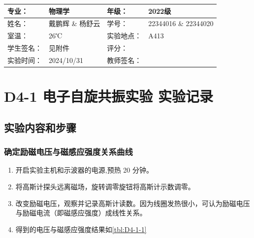 \documentclass[dvipsnames, svgnames,a4paper,11pt]{article}
\begin{document}
\clearpage
\begin{table}
	\renewcommand\arraystretch{1.7}
	\centering
	\begin{tabularx}{\textwidth}{|X|X|X|X|}
	\hline
	专业：& 物理学 &年级：& 2022级 \\
	\hline
	姓名：& 戴鹏辉 \& 杨舒云 & 学号：& 22344016 \& 22344020 \\
	\hline
	室温：& 26℃ & 实验地点： & A413 \\
	\hline
	学生签名：& 见附件 & 评分： &\\
	\hline
	实验时间：& 2024/10/31& 教师签名：&\\
	\hline
	\end{tabularx}
\end{table}

\section{D4-1 \quad 电子自旋共振实验 \quad\heiti 实验记录}

\subsection{实验内容和步骤}

	\subsubsection{确定励磁电压与磁感应强度关系曲线}

		\begin{enumerate}
			\item 开启实验主机和示波器的电源,预热 20 分钟。
			\item 将高斯计探头远离磁场，旋转调零旋钮将高斯计示数调零。
			\item 改变励磁电压，观察并记录高斯计读数。因为线圈发热很小，可认为励磁电压与励磁电流（即磁感应强度）成线性关系。
			\item 得到的电压与磁感应强度结果如\cref{tbl:D4-1-1}
		\end{enumerate}

\end{document}
